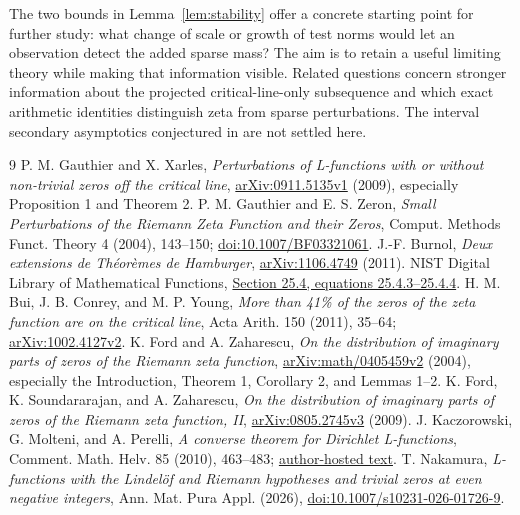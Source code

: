 \documentclass[11pt,a4paper]{article}
\theoremstyle{definition}
\theoremstyle{remark}
\begin{document}
The two bounds in Lemma~\ref{lem:stability} offer a concrete starting point
for further study: what change of scale or growth of test norms would let an
observation detect the added sparse mass? The aim is to retain a useful
limiting theory while making that information visible. Related questions concern stronger
information about the projected critical-line-only subsequence and which
exact arithmetic identities distinguish zeta from sparse perturbations. The
interval secondary asymptotics conjectured in \cite{FZ,FSZ} are not settled
here.

\begin{thebibliography}{9}
P. M. Gauthier and X. Xarles,
\emph{Perturbations of L-functions with or without non-trivial zeros off the
critical line}, \href{https://arxiv.org/abs/0911.5135}{arXiv:0911.5135v1} (2009),
especially Proposition 1 and Theorem 2.
P. M. Gauthier and E. S. Zeron,
\emph{Small Perturbations of the Riemann Zeta Function and their Zeros},
Comput. Methods Funct. Theory 4 (2004), 143--150;
\href{https://doi.org/10.1007/BF03321061}{doi:10.1007/BF03321061}.
J.-F. Burnol, \emph{Deux extensions de Th\'eor\`emes de Hamburger},
\href{https://arxiv.org/abs/1106.4749}{arXiv:1106.4749} (2011).
NIST Digital Library of Mathematical Functions,
\href{https://dlmf.nist.gov/25.4}{Section 25.4, equations 25.4.3--25.4.4}.
H. M. Bui, J. B. Conrey, and M. P. Young,
\emph{More than 41\% of the zeros of the zeta function are on the critical line},
Acta Arith. 150 (2011), 35--64;
\href{https://arxiv.org/abs/1002.4127}{arXiv:1002.4127v2}.
K. Ford and A. Zaharescu,
\emph{On the distribution of imaginary parts of zeros of the Riemann zeta function},
\href{https://arxiv.org/abs/math/0405459}{arXiv:math/0405459v2} (2004),
especially the Introduction, Theorem 1, Corollary 2, and Lemmas 1--2.
K. Ford, K. Soundararajan, and A. Zaharescu,
\emph{On the distribution of imaginary parts of zeros of the Riemann zeta function, II},
\href{https://arxiv.org/abs/0805.2745}{arXiv:0805.2745v3} (2009).
J. Kaczorowski, G. Molteni, and A. Perelli,
\emph{A converse theorem for Dirichlet L-functions},
Comment. Math. Helv. 85 (2010), 463--483;
\href{https://sites.unimi.it/molteni/research/papers-pdf/23-molteni-A_converse_theorem_for_Dirichlet_L-functions.pdf}{author-hosted text}.
T. Nakamura,
\emph{L-functions with the Lindel\"of and Riemann hypotheses and trivial zeros
at even negative integers}, Ann. Mat. Pura Appl. (2026),
\href{https://doi.org/10.1007/s10231-026-01726-9}{doi:10.1007/s10231-026-01726-9}.
\end{thebibliography}
\end{document}
